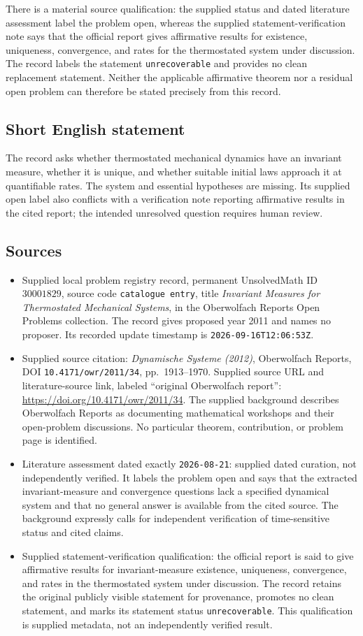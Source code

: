 \documentclass[11pt]{article}
\begin{document}
There is a material source qualification: the supplied status and dated literature assessment label the problem open, whereas the supplied statement-verification note says that the official report gives affirmative results for existence, uniqueness, convergence, and rates for the thermostated system under discussion. The record labels the statement \texttt{unrecoverable} and provides no clean replacement statement. Neither the applicable affirmative theorem nor a residual open problem can therefore be stated precisely from this record.
\subsection{Short English statement}
The record asks whether thermostated mechanical dynamics have an invariant measure, whether it is unique, and whether suitable initial laws approach it at quantifiable rates. The system and essential hypotheses are missing. Its supplied open label also conflicts with a verification note reporting affirmative results in the cited report; the intended unresolved question requires human review.
\subsection{Sources}
\begin{itemize}
\item Supplied local problem registry record, permanent UnsolvedMath ID \(30001829\), source code \texttt{catalogue entry}, title \emph{Invariant Measures for Thermostated Mechanical Systems}, in the Oberwolfach Reports Open Problems collection. The record gives proposed year 2011 and names no proposer. Its recorded update timestamp is \texttt{2026-09-16T12:06:53Z}.
\item Supplied source citation: \emph{Dynamische Systeme (2012)}, Oberwolfach Reports, DOI \texttt{10.4171/owr/2011/34}, pp.\ 1913--1970. Supplied source URL and literature-source link, labeled ``original Oberwolfach report'': \url{https://doi.org/10.4171/owr/2011/34}. The supplied background describes Oberwolfach Reports as documenting mathematical workshops and their open-problem discussions. No particular theorem, contribution, or problem page is identified.
\item Literature assessment dated exactly \texttt{2026-08-21}: supplied dated curation, not independently verified. It labels the problem open and says that the extracted invariant-measure and convergence questions lack a specified dynamical system and that no general answer is available from the cited source. The background expressly calls for independent verification of time-sensitive status and cited claims.
\item Supplied statement-verification qualification: the official report is said to give affirmative results for invariant-measure existence, uniqueness, convergence, and rates in the thermostated system under discussion. The record retains the original publicly visible statement for provenance, promotes no clean statement, and marks its statement status \texttt{unrecoverable}. This qualification is supplied metadata, not an independently verified result.
\end{itemize}
\end{document}
